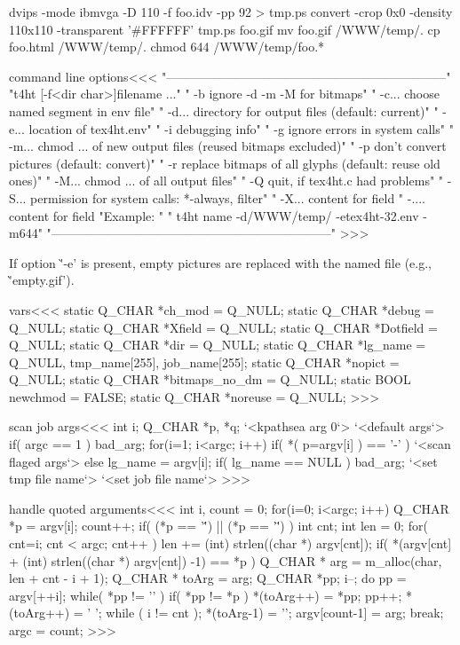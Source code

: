 {\Verbatim
   dvips -mode ibmvga -D 110 -f foo.idv -pp 92  > tmp.ps
   convert -crop 0x0 -density 110x110 -transparent '#FFFFFF' tmp.ps foo.gif
   mv foo.gif /WWW/temp/.
   cp foo.html /WWW/temp/.
   chmod 644 /WWW/temp/foo.*
\EndVerbatim


\<command line options\><<<
"\n--------------------------------------------------------------------\n"
"t4ht [-f<dir char>]filename ...\n"
"  -b     ignore -d -m -M for bitmaps\n"
"  -c...  choose named segment in env file\n"
"  -d...  directory for output files       (default:  current)\n"
"  -e...  location of tex4ht.env\n"
"  -i     debugging info\n"
"  -g     ignore errors in system calls\n"
"  -m...  chmod ... of new output files (reused bitmaps excluded)\n"
"  -p     don't convert pictures           (default:  convert)\n"
"  -r     replace bitmaps of all glyphs    (default:  reuse old ones)\n"
"  -M...  chmod ... of all output files\n"
"  -Q     quit, if tex4ht.c had problems\n"
"  -S...  permission for system calls: *-always, filter\n"
"  -X...  content for field %
"  -....  content for field %
"Example: \n"
"   t4ht name -d/WWW/temp/ -etex4ht-32.env -m644\n"
"--------------------------------------------------------------------\n"
>>>


If option \`'-e' is present, empty pictures are replaced
with the named file (e.g., \`'empty.gif').









\<vars\><<<
static Q_CHAR *ch_mod = Q_NULL;
static Q_CHAR *debug = Q_NULL;
static Q_CHAR *Xfield = Q_NULL;
static Q_CHAR *Dotfield = Q_NULL;
static Q_CHAR *dir = Q_NULL;
static Q_CHAR *lg_name  = Q_NULL, tmp_name[255], job_name[255];
static Q_CHAR *nopict = Q_NULL;
static Q_CHAR *bitmaps_no_dm = Q_NULL;
static BOOL newchmod = FALSE;
static Q_CHAR *noreuse = Q_NULL;
>>>


\<scan job args\><<<
{      int i;
       Q_CHAR *p, *q;
  `<kpathsea arg 0`>
  `<default args`>
  if( argc == 1 ){ bad_arg; }
  for(i=1; i<argc; i++){
    if( *( p=argv[i] ) == '-' ){ `<scan flaged args`> }
    else 
    {  lg_name = argv[i];  }
  }
  if( lg_name == NULL ){ bad_arg; }
  `<set tmp file name`> 
  `<set job file name`> 
}
>>>


\<handle quoted arguments\><<<
{ int i, count = 0;
 for(i=0; i<argc; i++){ 
   Q_CHAR *p = argv[i];
   count++;
   if( (*p == '\'') || (*p == '\"') ){ 
     int cnt;
     int len = 0;
     for( cnt=i; cnt < argc; cnt++ ){
       len += (int) strlen((char *) argv[cnt]);
       if( *(argv[cnt] + (int) strlen((char *) argv[cnt]) -1) == *p ){
           Q_CHAR * arg = m_alloc(char, len + cnt - i + 1);
           Q_CHAR * toArg = arg;
           Q_CHAR *pp;
           i--;
           do { 
             pp = argv[++i];
             while( *pp != '\0' ){
                if( *pp != *p ){ *(toArg++) = *pp; } 
                pp++;
             }
             *(toArg++) = ' ';
           } while ( i != cnt );
           *(toArg-1) = '\0';
           argv[count-1] = arg;
           break;
 } } } } 
 argc = count;
}
>>>




}
